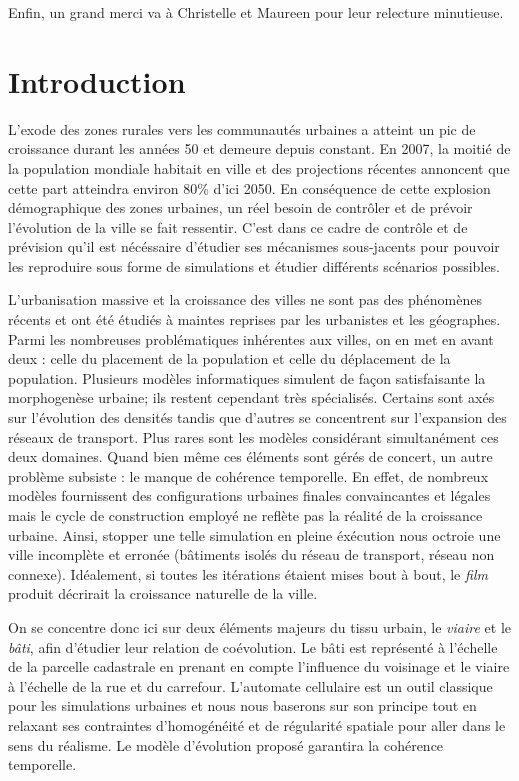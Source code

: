 \documentclass[10pt]{article}
\begin{document}
Enfin, un grand merci va à Christelle et Maureen pour leur relecture
minutieuse.

\newpage

\section{Introduction}

L'exode des zones rurales vers les communautés urbaines a atteint un
pic de croissance durant les années 50 et demeure depuis constant. En
2007, la moitié de la population mondiale habitait en ville et des
projections récentes annoncent que cette part atteindra environ 80\%
d'ici 2050. En conséquence de cette explosion démographique des zones
urbaines, un réel besoin de contrôler et de prévoir l'évolution de la
ville se fait ressentir. C'est dans ce cadre de contrôle et de
prévision qu'il est nécéssaire d'étudier ses mécanismes sous-jacents
pour pouvoir les reproduire sous forme de simulations et étudier
différents scénarios possibles.

L'urbanisation massive et la croissance des villes ne sont pas des
phénomènes récents et ont été étudiés à maintes reprises par les
urbanistes et les géographes. Parmi les nombreuses problématiques
inhérentes aux villes, on en met en avant deux : celle du placement de
la population et celle du déplacement de la population. Plusieurs
modèles informatiques simulent de façon satisfaisante la morphogenèse
urbaine; ils restent cependant très spécialisés. Certains sont axés
sur l'évolution des densités tandis que d'autres se concentrent sur
l'expansion des réseaux de transport. Plus rares sont les modèles
considérant simultanément ces deux domaines. Quand bien même ces
éléments sont gérés de concert, un autre problème subsiste : le manque
de cohérence temporelle. En effet, de nombreux modèles fournissent des
configurations urbaines finales convaincantes et légales mais le cycle
de construction employé ne reflète pas la réalité de la croissance
urbaine. Ainsi, stopper une telle simulation en pleine éxécution nous
octroie une ville incomplète et erronée (bâtiments isolés du réseau de
transport, réseau non connexe). Idéalement, si toutes les itérations
étaient mises bout à bout, le \textit{film} produit décrirait la
croissance naturelle de la ville.

On se concentre donc ici sur deux éléments majeurs du tissu urbain, le
\textit{viaire} et le \textit{bâti}, afin d'étudier leur relation de
coévolution. Le bâti est représenté à l'échelle de la parcelle
cadastrale en prenant en compte l'influence du voisinage et le viaire
à l'échelle de la rue et du carrefour. L'automate cellulaire est un
outil classique pour les simulations urbaines et nous nous baserons
sur son principe tout en relaxant ses contraintes d'homogénéité et de
régularité spatiale pour aller dans le sens du réalisme. Le modèle
d'évolution proposé garantira la cohérence temporelle.
\end{document}
